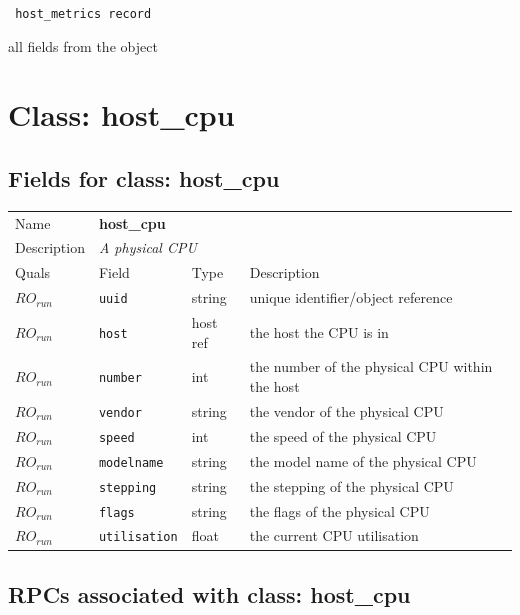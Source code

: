 \vspace{0.3cm}

{\tt 
host\_metrics record
}


all fields from the object
\vspace{0.3cm}
\vspace{0.3cm}
\vspace{0.3cm}

\vspace{1cm}
\newpage
\section{Class: host\_cpu}
\subsection{Fields for class: host\_cpu}
\begin{longtable}{|lllp{}|}
\hline
\multicolumn{1}{|l}{Name} & \multicolumn{3}{l|}{\bf host\_cpu} \\
\multicolumn{1}{|l}{Description} & \multicolumn{3}{l|}{\parbox{11cm}{\em A physical CPU}} \\
\hline
Quals & Field & Type & Description \\
\hline
$\mathit{RO}_\mathit{run}$ &  {\tt uuid} & string & unique identifier/object reference \\
$\mathit{RO}_\mathit{run}$ &  {\tt host} & host ref & the host the CPU is in \\
$\mathit{RO}_\mathit{run}$ &  {\tt number} & int & the number of the physical CPU within the host \\
$\mathit{RO}_\mathit{run}$ &  {\tt vendor} & string & the vendor of the physical CPU \\
$\mathit{RO}_\mathit{run}$ &  {\tt speed} & int & the speed of the physical CPU \\
$\mathit{RO}_\mathit{run}$ &  {\tt modelname} & string & the model name of the physical CPU \\
$\mathit{RO}_\mathit{run}$ &  {\tt stepping} & string & the stepping of the physical CPU \\
$\mathit{RO}_\mathit{run}$ &  {\tt flags} & string & the flags of the physical CPU \\
$\mathit{RO}_\mathit{run}$ &  {\tt utilisation} & float & the current CPU utilisation \\
\hline
\end{longtable}
\subsection{RPCs associated with class: host\_cpu}
